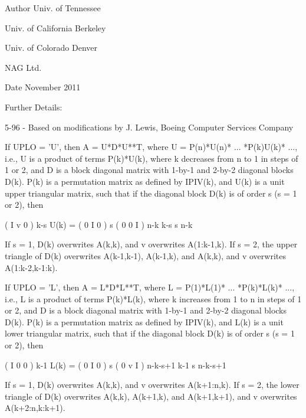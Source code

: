 \begin{DoxyAuthor}{Author}
Univ. of Tennessee 

Univ. of California Berkeley 

Univ. of Colorado Denver 

N\+A\+G Ltd. 
\end{DoxyAuthor}
\begin{DoxyDate}{Date}
November 2011 
\end{DoxyDate}
\begin{DoxyParagraph}{Further Details\+: }
\begin{DoxyVerb}  5-96 - Based on modifications by J. Lewis, Boeing Computer Services
         Company

  If UPLO = 'U', then A = U*D*U**T, where
     U = P(n)*U(n)* ... *P(k)U(k)* ...,
  i.e., U is a product of terms P(k)*U(k), where k decreases from n to
  1 in steps of 1 or 2, and D is a block diagonal matrix with 1-by-1
  and 2-by-2 diagonal blocks D(k).  P(k) is a permutation matrix as
  defined by IPIV(k), and U(k) is a unit upper triangular matrix, such
  that if the diagonal block D(k) is of order s (s = 1 or 2), then

             (   I    v    0   )   k-s
     U(k) =  (   0    I    0   )   s
             (   0    0    I   )   n-k
                k-s   s   n-k

  If s = 1, D(k) overwrites A(k,k), and v overwrites A(1:k-1,k).
  If s = 2, the upper triangle of D(k) overwrites A(k-1,k-1), A(k-1,k),
  and A(k,k), and v overwrites A(1:k-2,k-1:k).

  If UPLO = 'L', then A = L*D*L**T, where
     L = P(1)*L(1)* ... *P(k)*L(k)* ...,
  i.e., L is a product of terms P(k)*L(k), where k increases from 1 to
  n in steps of 1 or 2, and D is a block diagonal matrix with 1-by-1
  and 2-by-2 diagonal blocks D(k).  P(k) is a permutation matrix as
  defined by IPIV(k), and L(k) is a unit lower triangular matrix, such
  that if the diagonal block D(k) is of order s (s = 1 or 2), then

             (   I    0     0   )  k-1
     L(k) =  (   0    I     0   )  s
             (   0    v     I   )  n-k-s+1
                k-1   s  n-k-s+1

  If s = 1, D(k) overwrites A(k,k), and v overwrites A(k+1:n,k).
  If s = 2, the lower triangle of D(k) overwrites A(k,k), A(k+1,k),
  and A(k+1,k+1), and v overwrites A(k+2:n,k:k+1).\end{DoxyVerb}
 
\end{DoxyParagraph}

